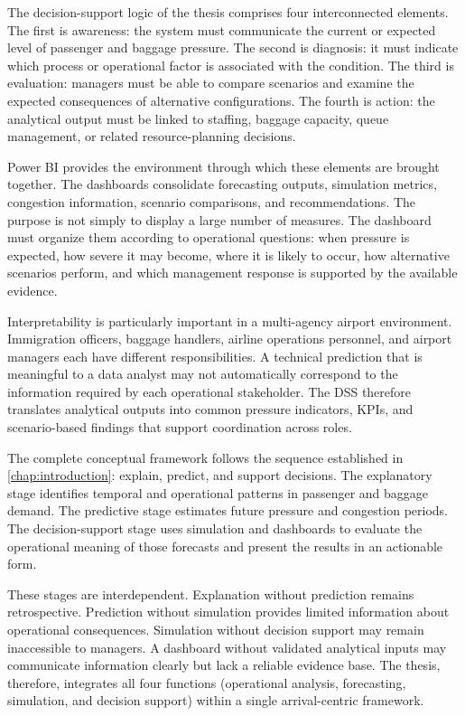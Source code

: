 The decision-support logic of the thesis comprises four interconnected elements. The first is awareness: the system must communicate the current or expected level of passenger and baggage pressure. The second is diagnosis: it must indicate which process or operational factor is associated with the condition. The third is evaluation: managers must be able to compare scenarios and examine the expected consequences of alternative configurations. The fourth is action: the analytical output must be linked to staffing, baggage capacity, queue management, or related resource-planning decisions.

Power BI provides the environment through which these elements are brought together. The dashboards consolidate forecasting outputs, simulation metrics, congestion information, scenario comparisons, and recommendations. The purpose is not simply to display a large number of measures. The dashboard must organize them according to operational questions: when pressure is expected, how severe it may become, where it is likely to occur, how alternative scenarios perform, and which management response is supported by the available evidence.

Interpretability is particularly important in a multi-agency airport environment. Immigration officers, baggage handlers, airline operations personnel, and airport managers each have different responsibilities. A technical prediction that is meaningful to a data analyst may not automatically correspond to the information required by each operational stakeholder. The DSS therefore translates analytical outputs into common pressure indicators, KPIs, and scenario-based findings that support coordination across roles.

The complete conceptual framework follows the sequence established in \cref{chap:introduction}: explain, predict, and support decisions. The explanatory stage identifies temporal and operational patterns in passenger and baggage demand. The predictive stage estimates future pressure and congestion periods. The decision-support stage uses simulation and dashboards to evaluate the operational meaning of those forecasts and present the results in an actionable form.

These stages are interdependent. Explanation without prediction remains retrospective. Prediction without simulation provides limited information about operational consequences. Simulation without decision support may remain inaccessible to managers. A dashboard without validated analytical inputs may communicate information clearly but lack a reliable evidence base. The thesis, therefore, integrates all four functions (operational analysis, forecasting, simulation, and decision support) within a single arrival-centric framework.

